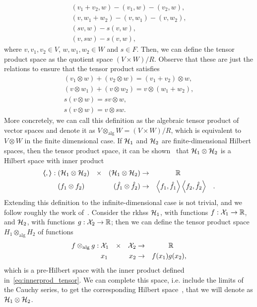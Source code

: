 \begin{align*}
    (v_1 + v_2, w) - (v_1, w) - (v_2, w), \\
    (v, w_1 + w_2) - (v, w_1) - (v, w_2), \\
    (sv, w) - s(v, w),                    \\
    (v, sw) - s(v, w),
\end{align*}
where $v, v_1, v_2 \in V$, $w, w_1, w_2 \in W$ and $s \in F$. Then, we can define the tensor product space as the quotient space $(V \times W)/R$. Observe that these are just the relations to ensure that the tensor product satisfies 
\begin{align*}
    (v_1 \otimes w) + (v_2 \otimes w) = (v_1 + v_2) \otimes w,\\
    (v \otimes w_1) + (v \otimes w_2) = v \otimes (w_1 + w_2), \\
    s(v \otimes w) = sv \otimes w,                    \\
    s(v \otimes w) = v \otimes sw.
\end{align*}
More concretely, we can call this definition as the algebraic tensor product of vector spaces and denote it as $V \otimes_{\text{alg}} W = (V \times W)/R$, which is equivalent to $V \otimes W$ in the finite dimensional case.
If $\mathcal{H}_1$ and $\mathcal{H}_2$ are finite-dimensional Hilbert spaces, then the tensor product space, it can be shown~\citep{Kadison1983} that $\mathcal{H}_1 \otimes \mathcal{H}_2$ is a Hilbert space with inner product
\begin{equation}
    \label{eq:innerprod_tensor}
    \begin{aligned}
        \dotp{}{}:\; & (\rkhs_1 \otimes \rkhs_2) & \times &  & (\rkhs_1 \otimes \rkhs_2)     & \to & \reals                &                       &   \\
                     & (f_1 \otimes f_2)         &        &  & (\hat{f}_1 \otimes \hat{f}_2) & \to & \dotp{f_1}{\hat{f}_1} & \dotp{f_2}{\hat{f}_2} & .
    \end{aligned}
\end{equation}
%
Extending this definition to the infinite-dimensional case is not trivial, and we follow roughly the work of~\citet{Kadison1983}.
Consider the \acrshort{rkhss} $\mathcal{H}_1$, with functions  $f: \mathcal{X}_1 \to \mathbb{R}$, and $\mathcal{H}_2$, with functions $g: \mathcal{X}_2 \to \mathbb{R}$; then we can define the tensor product space $H_1 \otimes_{\text{alg}} H_2$ of functions
\begin{equation}\nonumber
    \begin{aligned}
        f \otimes_{\text{alg}} g:\; & \mathcal{X}_1 & \times &  & \mathcal{X}_2 & \to &        & \mathbb{R}   \\
                                    & x_1      &      &  & x_2      & \to & f(x_1) & g(x_2) ,
    \end{aligned}
\end{equation}
which is a pre-Hilbert space with the inner product defined in~\eqref{eq:innerprod_tensor}.
We can complete this space, i.e. include the limits of the Cauchy series, to get the corresponding Hilbert space~\citep{Kadison1983}, that we will denote as $\mathcal{H}_1 \otimes \mathcal{H}_2$.

